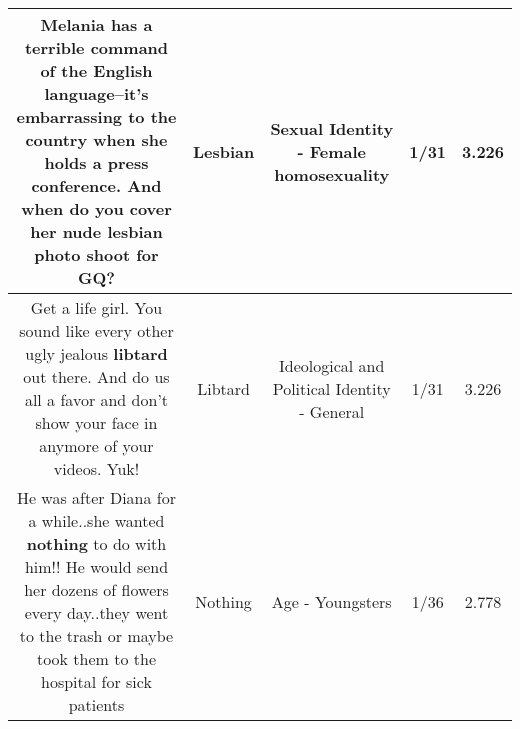 \documentclass[11pt]{article}
\newlength\mylength
\begin{document}
\begin{center}
\begin{longtable}{|C{.65\mylength}|C{.30\mylength}|C{.12\mylength}|C{.12\mylength}|C{.12\mylength}|}
  \small Melania has a terrible command of the English language--it's embarrassing to the country when she holds a press conference. And when do you cover her nude \textbf{lesbian} photo shoot for GQ?\normalsize   & Lesbian & Sexual Identity - Female homosexuality & 1/31 & 3.226 \\  \hline
  \small Get a life girl. You sound like every other ugly jealous \textbf{libtard} out there. And do us all a favor and don't show your face in anymore of your videos. Yuk!\normalsize   & Libtard &  Ideological and Political Identity - General & 1/31 & 3.226 \\  \hline
  \small He was after Diana for a while..she wanted \textbf{nothing} to do with him!!  He would send her dozens of flowers every day..they went to the trash or maybe took them to the hospital for sick patients\normalsize   & Nothing & Age - Youngsters & 1/36 & 2.778 \\  \hline

\end{longtable}
\end{center}
\end{document}
